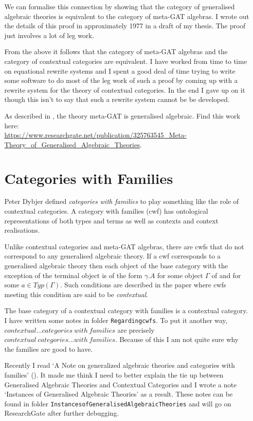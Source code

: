 \documentclass[10pt,a4paper]{article}
\theoremstyle{remark}
\newcommand{\myurl}[1]{{\footnotesize \url{#1}}}
\begin{document}
\note
We can formalise this connection by showing that the category of generalised algebraic theories 
is equivalent to the category of meta-GAT algebras.  I wrote out the details of this proof in approximately 1977 in a draft of my thesis. The proof just involves a lot of leg work. 

\note
From the above it follows that the category of meta-GAT algebras and the category of contextual categories are equivalent. I have worked from time to time on equational rewrite systems and I spent a good deal of time trying to write some software to do most of the leg work of such a proof by coming up with a rewrite system for the theory of contextual categories. In the end I gave up on it though this isn't to say that such a rewrite system cannot be be developed.

\note 
As described in \cite{CartmellMetaTheory}, the theory meta-GAT is generalised algebraic.
Find this work here:\\
\myurl{https://www.researchgate.net/publication/325763545_Meta-Theory_of_Generalised_Algebraic_Theories}.

\section{Categories with Families}
\note Peter Dybjer defined \textit{categories with families}  to play something like the role of contextual categories. 
A category with families (cwf) has  ontological representations of both types and terms as well as contexts and context realisations. 

\note
Unlike contextual categories and meta-GAT algebras, there are cwfs that do not correspond to
any generalised algebraic theory. If a cwf corresponds to a generalised algebraic theory then each object of the base category \catcw with the exception of the terminal object is of the form $\gamma.A$ for some object $\Gamma$ of \catcw and for some $a \in Typ(\Gamma)$. Such conditions are described in the paper \cite{??}
where cwfs meeting this condition are said to be \textit{contextual}.

\note The base category of a  contextual category with families is a contextual category. I have written some notes in folder \verb!Regardingcwfs!. 
To put it another way, $contextual ... categories\  with\  families$ are precisely $contextual\ categories...with\ families$. Because of this
I am not quite sure why the families are good to have. 

\note Recently I read  `A Note on generalized algebraic theories and categories with families' (\cite{BCDEpaper}). It made me think I need to better explain the tie up between 
Generalised Algebraic Theories and Contextual Categories and I wrote a note `Instances of Generalised Algebraic Theories' as a result.
These notes can be found in folder \verb!InstancesofGeneralisedAlgebraicTheories! and will go on ResearchGate after further debugging.
\end{document}
